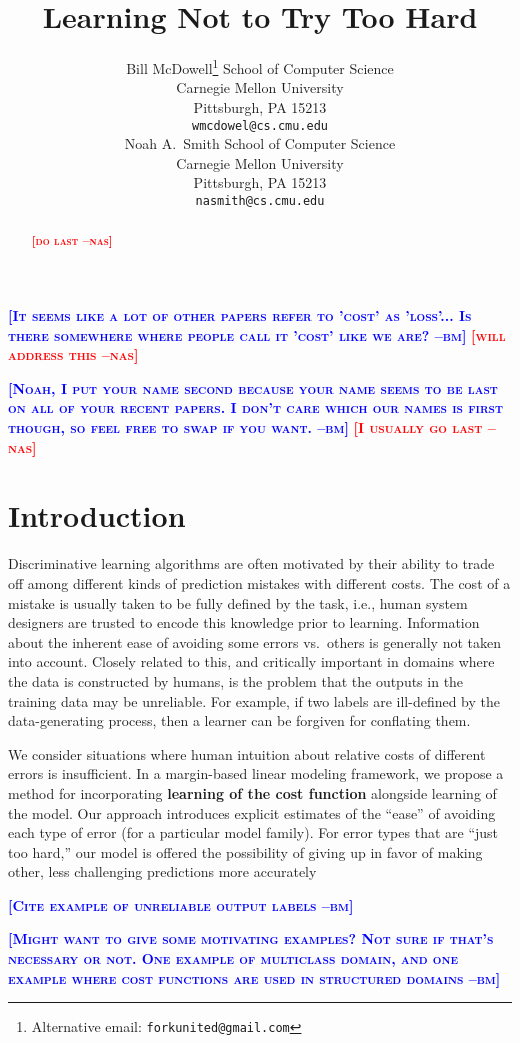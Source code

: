 \documentclass{article} %
\title{Learning Not to Try Too Hard}
\author{
Bill McDowell\thanks{Alternative email: \texttt{forkunited@gmail.com}}
School of Computer Science\\
Carnegie Mellon University\\
Pittsburgh, PA 15213 \\
\texttt{wmcdowel@cs.cmu.edu} \\
\And
Noah A.~Smith
School of Computer Science\\
Carnegie Mellon University\\
Pittsburgh, PA 15213 \\
\texttt{nasmith@cs.cmu.edu} \\
}
\newcommand{\bmcomment}[1]{\textcolor{blue}{\textsc{\textbf{[#1 --bm]}}}}
\newcommand{\nascomment}[1]{\textcolor{red}{\textsc{\textbf{[#1 --nas]}}}}
\begin{document}
\maketitle


\bmcomment{It seems like a lot of other papers refer to 'cost' as 'loss'... 
Is there somewhere where people call it 'cost' like we are?}
\nascomment{will address this}

\bmcomment{Noah, I put your name second because your name seems 
to be last on all of your recent papers.  I don't care which our names is
first though, so feel free to swap if you want.} \nascomment{I usually
go last}

\begin{abstract}
\nascomment{do last}
\end{abstract}

\section{Introduction}

Discriminative learning algorithms are often motivated by their
ability to trade off among different kinds of prediction mistakes with
different costs.  The cost of a mistake is usually taken to be fully
defined by the task, i.e., human system designers are trusted to
encode this knowledge prior to learning.  Information about the
inherent ease of avoiding some errors vs.~others is generally not
taken into account.   Closely related to this, and critically
important in domains where the data is constructed by humans, is the
problem that the outputs in the training data may be unreliable.  For
example, if two labels are ill-defined by the data-generating process,
then a learner can be forgiven for conflating them.

We consider situations where human intuition about relative costs of
different errors is insufficient.  In a margin-based linear modeling
framework, we propose a method for incorporating \textbf{learning of
  the cost function} alongside learning of the model.  Our approach
introduces explicit estimates of the ``ease'' of avoiding each type of
error
(for a particular model family).   For error types that are ``just too
hard,'' our model is offered the possibility of giving up in favor of
making other, less challenging predictions more accurately




\bmcomment{Cite example of unreliable output labels}

\bmcomment{Might want to give some motivating examples? Not sure if that's
necessary or not. One example of multiclass domain, and one example where
cost functions are used in structured domains}
\end{document}
